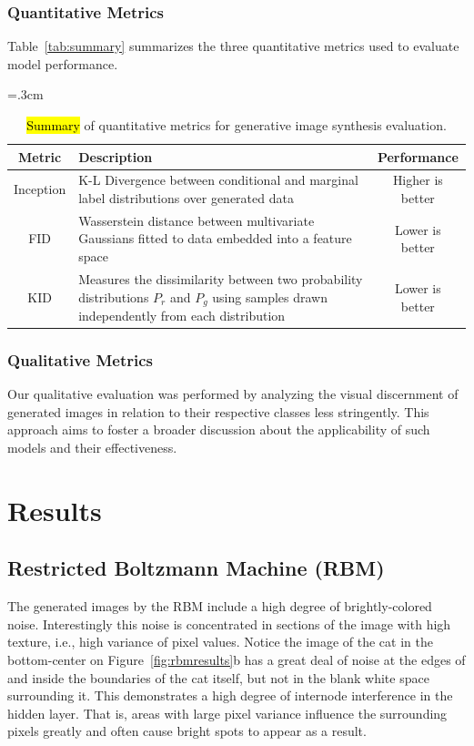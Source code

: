 \documentclass[technologies,article,accept,pdftex,moreauthors]{Definitions/mdpi}
\newcommand{\figref}[1]{Figure~\ref{#1}}
\begin{document}
\subsubsection{Quantitative Metrics}
Table~\ref{tab:summary} summarizes the three quantitative metrics used to evaluate model performance.

\begin{table}[H]
\caption{\label{tab:summary}\hl{Summary} %
 of quantitative metrics for generative image synthesis evaluation.\label{tab:metrics}} 
\tabcolsep=.3cm 
    \begin{tabular}{cp{8cm}c} 
\toprule
  \textbf{Metric}& \textbf{Description} &\textbf{Performance}\\ 
 \midrule        
 {{Inception}} & K-L Divergence between conditional and marginal label distributions over generated data & Higher is better\\   \midrule   
 FID & Wasserstein distance between multivariate Gaussians fitted to data embedded into a feature space & Lower is better\\   \midrule   
 KID & Measures the dissimilarity between two probability distributions $P_r$ and $P_g$ using samples drawn independently from each distribution & Lower is better\\
 \bottomrule
    \end{tabular} 
\end{table}


\subsubsection{Qualitative Metrics}
Our qualitative evaluation was performed by analyzing the visual discernment of generated images in relation to their respective classes less stringently. This approach aims to foster a broader discussion about the applicability of such models and their effectiveness.

\section{Results}
\subsection{Restricted Boltzmann Machine (RBM)}

The generated images by the RBM include a high degree of brightly-colored noise. Interestingly this noise is concentrated in sections of the image with high texture, i.e., high variance of pixel values. Notice the image of the cat in the bottom-center on \figref{fig:rbmresults}b has a great deal of noise at the edges of and inside the boundaries of the cat itself, but not in the blank white space surrounding it. This demonstrates a high degree of internode interference in the hidden layer. That is, areas with large pixel variance influence the surrounding pixels greatly and often cause bright spots to appear as a result.
\end{document}
